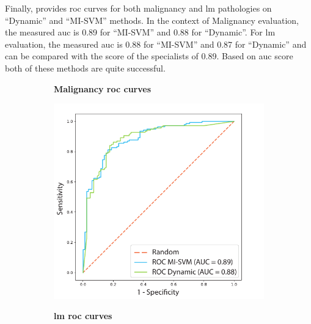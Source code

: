 \documentclass[journal,article,accept,moreauthors,pdftex, applsci]{Definitions/mdpi}
\begin{document}
Finally,  provides \ac{roc} curves for both malignancy and \ac{lm} pathologies on “Dynamic” and “MI-SVM” methods. In the context of Malignancy evaluation, the measured \ac{auc} is 0.89 for “MI-SVM” and 0.88 for “Dynamic”. For \ac{lm} evaluation, the measured \ac{auc} is 0.88 for “MI-SVM” and 0.87 for “Dynamic” and can be compared with the score of the specialists of 0.89. Based on \ac{auc} score both of these methods are quite successful.\par
\begin{figure}[H]
    \centering
    \begin{subfigure}{0.47\linewidth}
        \centering
        \textbf{Malignancy \ac{roc} curves}\par
        \includegraphics[width=\linewidth]{Figures/Result_Malignancy.pdf}
    \end{subfigure}
    \begin{subfigure}{0.47\linewidth}
        \centering
        \textbf{\ac{lm} \ac{roc} curves}\par

\end{subfigure}
\end{figure}
\end{document}
